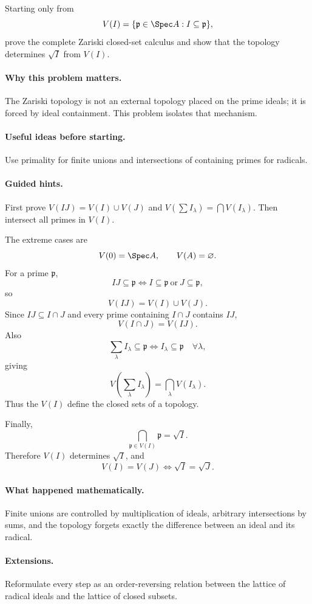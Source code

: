 \begin{problem}
Starting only from
\[
V(I)=\{\mathfrak p\in\Spec A:I\subseteq\mathfrak p\},
\]
prove the complete Zariski closed-set calculus and show that the topology determines
$\sqrt I$ from $V(I)$.
\end{problem}

\paragraph{Why this problem matters.}
The Zariski topology is not an external topology placed on the prime ideals; it is forced by
ideal containment.  This problem isolates that mechanism.

\paragraph{Useful ideas before starting.}
Use primality for finite unions and intersections of containing primes for radicals.

\paragraph{Guided hints.}
First prove $V(IJ)=V(I)\cup V(J)$ and
$V(\sum I_\lambda)=\bigcap V(I_\lambda)$.  Then intersect all primes in $V(I)$.

\begin{solution}
The extreme cases are
\[
V(0)=\Spec A,\qquad V(A)=\varnothing.
\]
For a prime $\mathfrak p$,
\[
IJ\subseteq\mathfrak p
\iff
I\subseteq\mathfrak p\ \text{or}\ J\subseteq\mathfrak p,
\]
so
\[
V(IJ)=V(I)\cup V(J).
\]
Since $IJ\subseteq I\cap J$ and every prime containing $I\cap J$ contains $IJ$,
\[
V(I\cap J)=V(IJ).
\]
Also
\[
\sum_\lambda I_\lambda\subseteq\mathfrak p
\iff
I_\lambda\subseteq\mathfrak p\quad\forall\lambda,
\]
giving
\[
V\!\left(\sum_\lambda I_\lambda\right)=\bigcap_\lambda V(I_\lambda).
\]
Thus the $V(I)$ define the closed sets of a topology.

Finally,
\[
\bigcap_{\mathfrak p\in V(I)}\mathfrak p=\sqrt I.
\]
Therefore $V(I)$ determines $\sqrt I$, and
\[
V(I)=V(J)\iff\sqrt I=\sqrt J.
\]
\end{solution}

\paragraph{What happened mathematically.}
Finite unions are controlled by multiplication of ideals, arbitrary intersections by sums,
and the topology forgets exactly the difference between an ideal and its radical.

\paragraph{Extensions.}
Reformulate every step as an order-reversing relation between the lattice of radical ideals
and the lattice of closed subsets.
